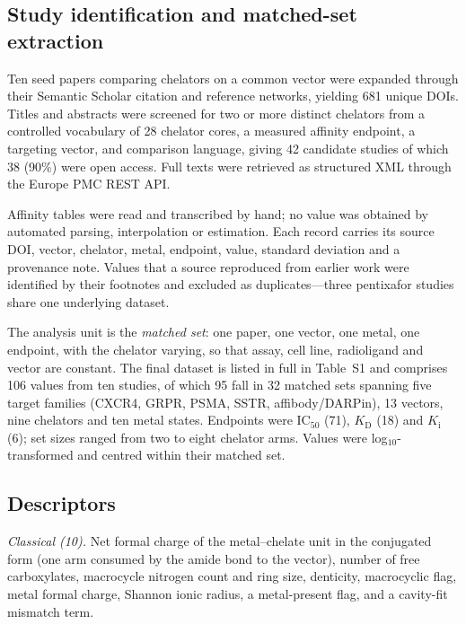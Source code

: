 \documentclass[twoside,twocolumn,9pt]{article}
\begin{document}
\subsection{Study identification and matched-set extraction}

Ten seed papers comparing chelators on a common vector were expanded through their Semantic Scholar citation and reference networks, yielding 681 unique DOIs. Titles and abstracts were screened for two or more distinct chelators from a controlled vocabulary of 28 chelator cores, a measured affinity endpoint, a targeting vector, and comparison language, giving 42 candidate studies of which 38 (90\%) were open access. Full texts were retrieved as structured XML through the Europe PMC REST API.

Affinity tables were read and transcribed by hand; no value was obtained by automated parsing, interpolation or estimation. Each record carries its source DOI, vector, chelator, metal, endpoint, value, standard deviation and a provenance note. Values that a source reproduced from earlier work were identified by their footnotes and excluded as duplicates---three pentixafor studies\cite{Poschenrieder2016a,Poschenrieder2016b,Poschenrieder2017} share one underlying dataset.

The analysis unit is the \emph{matched set}: one paper, one vector, one metal, one endpoint, with the chelator varying, so that assay, cell line, radioligand and vector are constant. The final dataset is listed in full in Table~S1 and comprises 106 values from ten studies,\cite{Poschenrieder2016a,Poschenrieder2017,Mitran2019,Fischer2025,Weineisen2014,Sinnes2020,Basaco2024a,Basaco2024b,Rinne2019,Rinne2020} of which 95 fall in 32 matched sets spanning five target families (CXCR4, GRPR, PSMA, SSTR, affibody/DARPin), 13 vectors, nine chelators and ten metal states. Endpoints were IC$_{50}$ (71), $K_\text{D}$ (18) and $K_\text{i}$ (6); set sizes ranged from two to eight chelator arms. Values were log$_{10}$-transformed and centred within their matched set.

\subsection{Descriptors}

\emph{Classical (10).} Net formal charge of the metal--chelate unit in the conjugated form (one arm consumed by the amide bond to the vector), number of free carboxylates, macrocycle nitrogen count and ring size, denticity, macrocyclic flag, metal formal charge, Shannon ionic radius, a metal-present flag, and a cavity-fit mismatch term.
\end{document}
